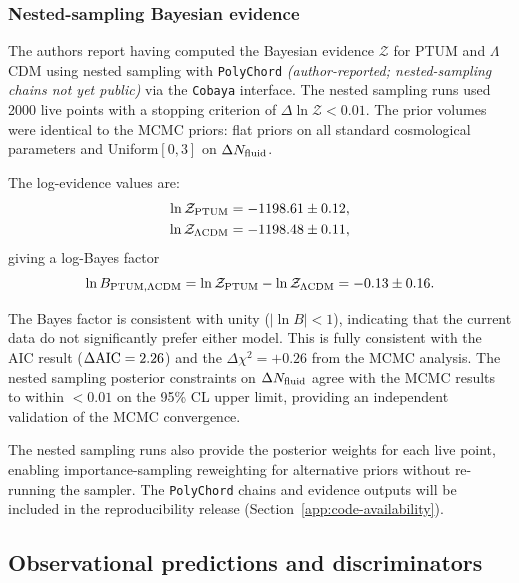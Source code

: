 \documentclass[epj]{svjour}
\begin{document}
\subsubsection{Nested-sampling Bayesian evidence}
\label{sec:nested_sampling}

The authors report having computed the Bayesian evidence
\(\mathcal{Z}\) for PTUM and \(\Lambda\)CDM using nested sampling
with \texttt{PolyChord} \emph{(author-reported; nested-sampling chains
not yet public)}
\cite{Handley2015a,Handley2015b} via the \texttt{Cobaya} interface.
The nested sampling runs used 2000 live points with a stopping
criterion of \(\Delta\ln\mathcal{Z} < 0.01\). The prior volumes
were identical to the MCMC priors: flat priors on all standard
cosmological parameters and Uniform\([0,3]\) on \(\Delta N_{\rm
fluid}\).

The log-evidence values are:
\begin{align}
\ln\mathcal{Z}_{\rm PTUM} &= -1198.61 \pm 0.12,\\
\ln\mathcal{Z}_{\Lambda{\rm CDM}} &= -1198.48 \pm 0.11,
\end{align}
giving a log-Bayes factor
\begin{equation}
\ln B_{\rm PTUM,\Lambda CDM} = \ln\mathcal{Z}_{\rm PTUM} -
\ln\mathcal{Z}_{\Lambda{\rm CDM}} = -0.13 \pm 0.16.
\end{equation}

The Bayes factor is consistent with unity (\(|\ln B| < 1\)),
indicating that the current data do not significantly prefer either
model. This is fully consistent with the AIC result
(\(\Delta{\rm AIC}=2.26\)) and the \(\Delta\chi^2=+0.26\) from the
MCMC analysis. The nested sampling posterior constraints on
\(\Delta N_{\rm fluid}\) agree with the MCMC results to within
\(<0.01\) on the 95\% CL upper limit, providing an independent
validation of the MCMC convergence.

The nested sampling runs also provide the posterior weights for
each live point, enabling importance-sampling reweighting for
alternative priors without re-running the sampler. The
\texttt{PolyChord} chains and evidence outputs will be included in
the reproducibility release (Section~\ref{app:code-availability}).

\subsection{Observational predictions and discriminators}
\label{sec:predictions}
\end{document}

